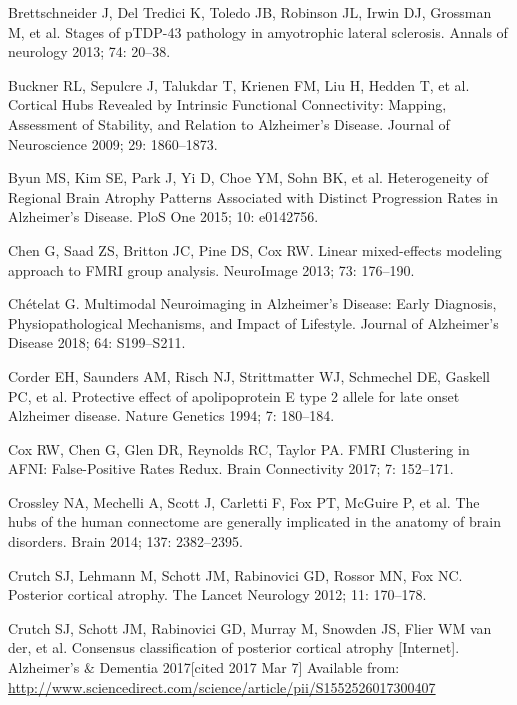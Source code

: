 \documentclass[]{article}
\begin{document}
\hypertarget{ref-brettschneider_stages_2013}{}
Brettschneider J, Del Tredici K, Toledo JB, Robinson JL, Irwin DJ,
Grossman M, et al. Stages of pTDP-43 pathology in amyotrophic lateral
sclerosis. Annals of neurology 2013; 74: 20--38.

\hypertarget{ref-buckner_cortical_2009}{}
Buckner RL, Sepulcre J, Talukdar T, Krienen FM, Liu H, Hedden T, et al.
Cortical Hubs Revealed by Intrinsic Functional Connectivity: Mapping,
Assessment of Stability, and Relation to Alzheimer's Disease. Journal of
Neuroscience 2009; 29: 1860--1873.

\hypertarget{ref-byun_heterogeneity_2015}{}
Byun MS, Kim SE, Park J, Yi D, Choe YM, Sohn BK, et al. Heterogeneity of
Regional Brain Atrophy Patterns Associated with Distinct Progression
Rates in Alzheimer's Disease. PloS One 2015; 10: e0142756.

\hypertarget{ref-chen_linear_2013}{}
Chen G, Saad ZS, Britton JC, Pine DS, Cox RW. Linear mixed-effects
modeling approach to FMRI group analysis. NeuroImage 2013; 73: 176--190.

\hypertarget{ref-chetelat_multimodal_2018}{}
Chételat G. Multimodal Neuroimaging in Alzheimer's Disease: Early
Diagnosis, Physiopathological Mechanisms, and Impact of Lifestyle.
Journal of Alzheimer's Disease 2018; 64: S199--S211.

\hypertarget{ref-corder_protective_1994}{}
Corder EH, Saunders AM, Risch NJ, Strittmatter WJ, Schmechel DE, Gaskell
PC, et al. Protective effect of apolipoprotein E type 2 allele for late
onset Alzheimer disease. Nature Genetics 1994; 7: 180--184.

\hypertarget{ref-cox_fmri_2017}{}
Cox RW, Chen G, Glen DR, Reynolds RC, Taylor PA. FMRI Clustering in
AFNI: False-Positive Rates Redux. Brain Connectivity 2017; 7: 152--171.

\hypertarget{ref-crossley_hubs_2014}{}
Crossley NA, Mechelli A, Scott J, Carletti F, Fox PT, McGuire P, et al.
The hubs of the human connectome are generally implicated in the anatomy
of brain disorders. Brain 2014; 137: 2382--2395.

\hypertarget{ref-crutch_posterior_2012}{}
Crutch SJ, Lehmann M, Schott JM, Rabinovici GD, Rossor MN, Fox NC.
Posterior cortical atrophy. The Lancet Neurology 2012; 11: 170--178.

\hypertarget{ref-crutch_consensus_2017}{}
Crutch SJ, Schott JM, Rabinovici GD, Murray M, Snowden JS, Flier WM van
der, et al. Consensus classification of posterior cortical atrophy
{[}Internet{]}. Alzheimer's \& Dementia 2017{[}cited 2017 Mar 7{]}
Available from:
\url{http://www.sciencedirect.com/science/article/pii/S1552526017300407}
\end{document}
